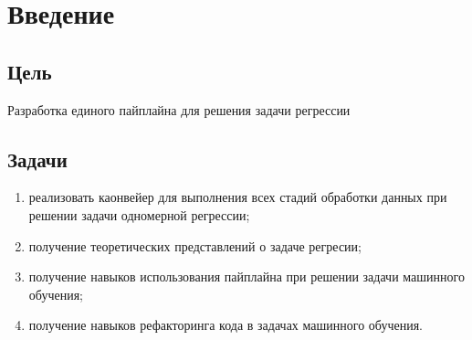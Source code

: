 \chapter{Введение}
\label{ch:intro}

\section{Цель}  

Разработка единого пайплайна для решения
задачи регрессии


\section{Задачи} 

\begin{enumerate} 
\item реализовать каонвейер для выполнения всех стадий обработки данных
при решении задачи одномерной регрессии;
\item получение теоретических представлений о задаче регресии;
\item получение навыков использования пайплайна при решении задачи
машинного обучения;
\item получение навыков рефакторинга кода в задачах машинного обучения.
\end{enumerate}
  

\endinput 